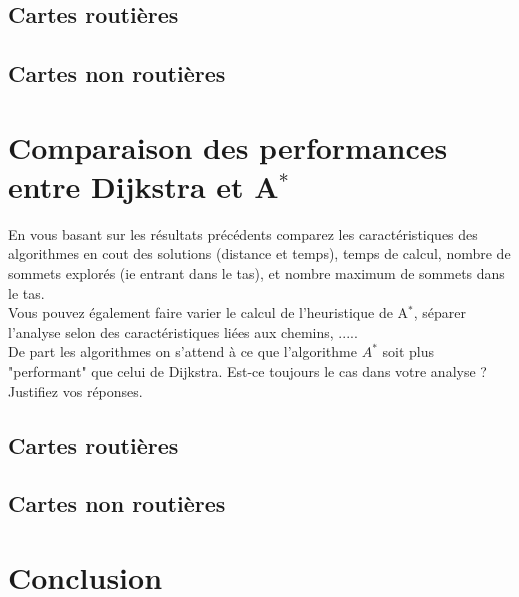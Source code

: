 \subsection{Cartes routières}

\subsection{Cartes non routières}

\section{Comparaison des performances entre Dijkstra et A$^*$}
En vous basant sur les résultats précédents comparez les caractéristiques des algorithmes en cout des solutions (distance et temps), temps de calcul, nombre de sommets explorés (ie entrant dans le tas), et nombre maximum de sommets dans le tas.
\\
Vous pouvez également faire varier le calcul de l'heuristique de A$^*$, séparer l'analyse selon des caractéristiques liées aux chemins, .....
\\
De part les algorithmes on s'attend à ce que l'algorithme $A^*$ soit plus "performant" que celui de Dijkstra. Est-ce toujours le cas dans votre analyse ? Justifiez vos réponses.

\subsection{Cartes routières}

\subsection{Cartes non routières}

\section{Conclusion}
